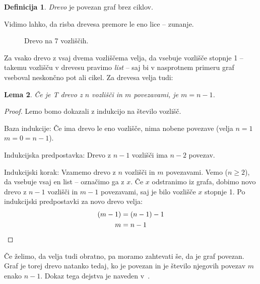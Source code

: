 \documentclass[12pt,a4paper]{amsart}
\theoremstyle{definition} %
\newtheorem{definicija}{Definicija}[section]
\theoremstyle{plain} %
\newtheorem{lema}[definicija]{Lema}
\begin{document}
\begin{definicija}
    \emph{Drevo} je povezan graf brez ciklov.
\end{definicija}

Vidimo lahko, da risba drevesa premore le eno lice -- zunanje.

\begin{figure}[h]
    \caption{Drevo na 7 vozliščih.}
\end{figure}

Za vsako drevo z vsaj dvema vozliščema velja, da vsebuje vozlišče stopnje 1 -- takemu vozlišču v drevesu pravimo \emph{list} -- saj bi v nasprotnem primeru graf vseboval neskončno pot ali cikel. Za drevesa velja tudi:

\begin{lema}
    Če je T drevo z $n$ vozlišči in $m$ povezavami, je $m=n-1$.
\end{lema}

\begin{proof}
    Lemo bomo dokazali z indukcijo na število vozlišč.
    
    Baza indukcije: Če ima drevo le eno vozlišče, nima nobene povezave (velja $n = 1$ $m = 0 = n-1$).
    
    Indukcijska predpostavka: Drevo z $n-1$ vozlišči ima $n-2$ povezav.
    
    Indukcijski korak: Vzamemo drevo z $n$ vozlišči in $m$ povezavami. Vemo ($n \geq 2$), da vsebuje vsaj en list -- označimo ga z $x$. Če $x$ odstranimo iz grafa, dobimo novo drevo z $n-1$ vozlišči in $m-1$ povezavami, saj je bilo vozlišče $x$ stopnje 1. Po indukcijski predpostavki za novo drevo velja:
    \begin{align*}
        (m-1) &= (n-1) - 1 \\
        m     &= n - 1 \qedhere
    \end{align*}
\end{proof}

Če želimo, da velja tudi obratno, pa moramo zahtevati še, da je graf povezan. Graf je torej drevo natanko tedaj, ko je povezan in je število njegovih povezav $m$ enako $n-1$. Dokaz tega dejstva je naveden v~\cite[str.~57]{bib:potocnik}.
\end{document}
